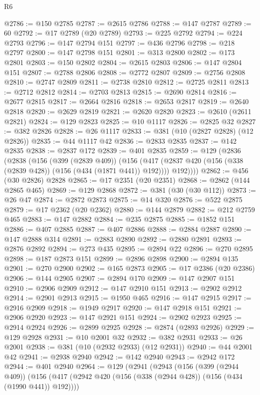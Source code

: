 \begin{lexlean}{R6}
\begin{coremodule}
@2786 := @150 @2785
@2787 := @2615 @2786
@2788 := @147 @2787
@2789 := 60
@2792 := @17 @2789 (@20 @2789)
@2793 := @225 @2792
@2794 := @224 @2793
@2796 := @147 @2794 @151
@2797 := @436 @2796
@2798 := @218 @2797
@2800 := @147 @2798 @151
@2801 := @313 @2800
@2802 := @173 @2801
@2803 := @150 @2802
@2804 := @2615 @2803
@2806 := @147 @2804 @151
@2807 := @2788 @2806
@2808 := @2772 @2807
@2809 := @2756 @2808
@2810 := @2747 @2809
@2811 := @2738 @2810
@2812 := @2725 @2811
@2813 := @2712 @2812
@2814 := @2703 @2813
@2815 := @2690 @2814
@2816 := @2677 @2815
@2817 := @2664 @2816
@2818 := @2653 @2817
@2819 := @2640 @2818
@2820 := @2629 @2819
@2821 := @2620 @2820
@2823 := @2610 (@2611 @2821)
@2824 := @129 @2823
@2825 := @10 @1117
@2826 := @2825 @32
@2827 := @382 @2826
@2828 := @26 @1117
@2833 := @381 (@10 (@2827 @2828) (@12 @2826))
@2835 := @44 @1117 @42
@2836 := @2833 @2835
@2837 := @142 @2835
@2838 := @2837 @172
@2839 := @401 @2835
@2859 := @129
    (@2836
      (@2838
        (@156
          (@399 (@2839 @409))
          (@156
            (@417 (@2837 @420 (@156 (@338 (@2839 @428)) (@156 (@434 (@1871 @441)) @192))))
            @192))))
@2862 := @456 (@30 @2826) @2828
@2865 := @17 @2351 (@20 @2351)
@2868 := @2862 (@144 @2865 @465)
@2869 := @129 @2868
@2872 := @381 (@30 (@30 @112))
@2873 := @26 @47
@2874 := @2872 @2873
@2875 := @14 @320
@2876 := @522 @2875
@2879 := @17 @2362 (@20 @2362)
@2880 := @144 @2879
@2882 := @212 @2759 @465
@2883 := @147 @2882
@2884 := @235 @2875
@2885 := @1852 @151
@2886 := @407 @2885
@2887 := @407 @2886
@2888 := @2884 @2887
@2890 := @147 @2888 @314
@2891 := @2883 @2890
@2892 := @2880 @2891
@2893 := @2876 @2892
@2894 := @273 @435
@2895 := @2894 @22
@2896 := @270 @2895
@2898 := @187 @2873 @151
@2899 := @2896 @2898
@2900 := @2894 @135
@2901 := @270 @2900
@2902 := @165 @2873
@2905 := @17 @2386 (@20 @2386)
@2906 := @144 @2905
@2907 := @2894 @170
@2909 := @147 @2907 @151
@2910 := @2906 @2909
@2912 := @147 @2910 @151
@2913 := @2902 @2912
@2914 := @2901 @2913
@2915 := @1950 @465
@2916 := @147 @2915
@2917 := @2916 @2909
@2918 := @1949 @2917
@2920 := @147 @2918 @151
@2921 := @2906 @2920
@2923 := @147 @2921 @151
@2924 := @2902 @2923
@2925 := @2914 @2924
@2926 := @2899 @2925
@2928 := @2874 (@2893 @2926)
@2929 := @129 @2928
@2931 := @10 @2001 @32
@2932 := @382 @2931
@2933 := @26 @2001
@2938 := @381 (@10 (@2932 @2933) (@12 @2931))
@2940 := @44 @2001 @42
@2941 := @2938 @2940
@2942 := @142 @2940
@2943 := @2942 @172
@2944 := @401 @2940
@2964 := @129
    (@2941
      (@2943
        (@156
          (@399 (@2944 @409))
          (@156
            (@417 (@2942 @420 (@156 (@338 (@2944 @428)) (@156 (@434 (@1990 @441)) @192))))

\end{coremodule}
\end{lexlean}
